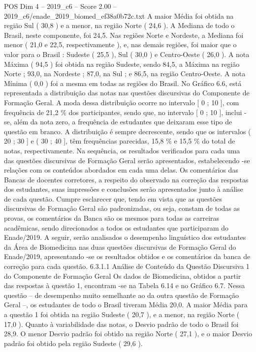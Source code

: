 \begin{textsample}{POS Dim 4 – 2019\_c6 – Score 2.00 – 2019\_c6/enade\_2019\_biomed\_ef38a0b72c.txt}
A maior Média foi obtida na região Sul ( 30,8 ) e a menor, na região Norte ( 24,6 ).
A Mediana de todo o Brasil, neste componente, foi 24,5.
Nas regiões Norte e Nordeste, a Mediana foi menor ( 21,0 e 22,5, respectivamente ), e, nas demais regiões, foi maior que o valor para o Brasil : Sudeste ( 25,5 ), Sul ( 30,0 ) e Centro-Oeste ( 26,0 ).
A nota Máxima ( 94,5 ) foi obtida na região Sudeste, sendo 84,5, a Máxima na região Norte ; 93,0, na Nordeste ; 87,0, na Sul ; e 86,5, na região Centro-Oeste.
A nota Mínima ( 0,0 ) foi a mesma em todas as regiões do Brasil.
No Gráfico 6.6, está representada a distribuição das notas nas questões discursivas do Componente de Formação Geral.
A moda dessa distribuição ocorre no intervalo [ 0 ; 10 ], com frequência de 21,2 \% dos participantes, sendo que, no intervalo [ 0 ; 10 ], inclui -se, além da nota zero, a frequência de estudantes que deixaram esse tipo de questão em branco.
A distribuição é sempre decrescente, sendo que os intervalos ( 20 ; 30 ] e ( 30 ; 40 ], têm frequências parecidas, 15,8 \% e 15,5 \% do total de notas, respectivamente.
Na sequência, os resultados verificados para cada uma das questões discursivas de Formação Geral serão apresentados, estabelecendo -se relações com os conteúdos abordados em cada uma delas.
Os comentários das Bancas de docentes corretores, a respeito do observado na correção das respostas dos estudantes, suas impressões e conclusões serão apresentados junto à análise de cada questão.
Cumpre esclarecer que, tendo em vista que as questões discursivas de Formação Geral são padronizadas, ou seja, constam de todas as provas, os comentários da Banca são os mesmos para todas as carreiras acadêmicas, sendo direcionados a todos os estudantes que participaram do Enade/2019.
A seguir, serão analisados o desempenho linguístico dos estudantes da Área de Biomedicina nas duas questões discursivas de Formação Geral do Enade/2019, apresentando -se os resultados obtidos e os comentários da banca de correção para cada questão. 6.3.1.1 Análise de Conteúdo da Questão Discursiva 1 do Componente de Formação Geral Os dados de Biomedicina, obtidos a partir das respostas à questão 1, encontram -se na Tabela 6.14 e no Gráfico 6.7.
Nessa questão – de desempenho muito semelhante ao da outra questão de Formação Geral –, os estudantes de todo o Brasil tiveram Média 20,0.
A maior Média para a questão 1 foi obtida na região Sudeste ( 20,7 ), e a menor, na região Norte ( 17,0 ).
Quanto à variabilidade das notas, o Desvio padrão de todo o Brasil foi 28,9.
O menor Desvio padrão foi obtido na região Norte ( 27,1 ), e o maior Desvio padrão foi obtido pela região Sudeste ( 29,6 ).

\end{textsample}
